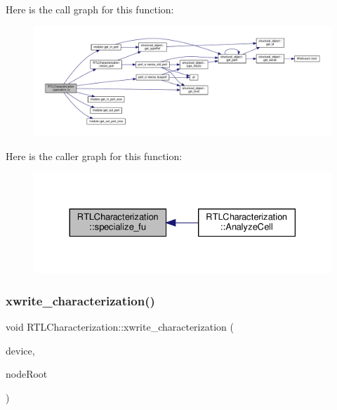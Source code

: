 Here is the call graph for this function\+:
\nopagebreak
\begin{figure}[H]
\begin{center}
\leavevmode
\includegraphics[width=350pt]{d9/d84/classRTLCharacterization_a39ae864464f1d90f555f8c6d682e65b2_cgraph}
\end{center}
\end{figure}
Here is the caller graph for this function\+:
\nopagebreak
\begin{figure}[H]
\begin{center}
\leavevmode
\includegraphics[width=330pt]{d9/d84/classRTLCharacterization_a39ae864464f1d90f555f8c6d682e65b2_icgraph}
\end{center}
\end{figure}
\mbox{\label{classRTLCharacterization_a45858c1c48c467edd0a7eb04d27a478b}} 
\subsubsection{\texorpdfstring{xwrite\+\_\+characterization()}{xwrite\_characterization()}}
{\footnotesize\ttfamily void R\+T\+L\+Characterization\+::xwrite\+\_\+characterization (\begin{DoxyParamCaption}\item[{const \hyperlink{target__device_8hpp_acedb2b7a617e27e6354a8049fee44eda}{target\+\_\+device\+Ref}}]{device,  }\item[{\hyperlink{classxml__element}{xml\+\_\+element} $\ast$}]{node\+Root }\end{DoxyParamCaption})\hspace{0.3cm}{\ttfamily [private]}}



